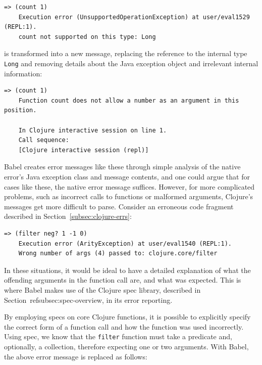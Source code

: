 \documentclass[12pt]{article}
\newcommand{\comment}[1]{{\bf \tt  {#1}}}
\newcommand{\emcomment}[1]{\textcolor{ForestGreen}{\comment{Elena: {#1}}}}
\begin{document}
\begin{lstlisting}[breaklines=true, basicstyle=\ttfamily]
    => (count 1)
    Execution error (UnsupportedOperationException) at user/eval1529 (REPL:1).
    count not supported on this type: Long
\end{lstlisting}
    
is transformed into a new message, replacing the reference to the internal type \verb|Long| and removing details about the Java exception object and irrelevant internal information:

\begin{lstlisting}[breaklines=true, basicstyle=\ttfamily]
    => (count 1)
    Function count does not allow a number as an argument in this position.

    In Clojure interactive session on line 1.
    Call sequence:
    [Clojure interactive session (repl)]
\end{lstlisting}

Babel creates error messages like these through simple analysis of the native error's Java exception class and message contents, and one could argue that for cases like these, the native error message suffices. However, for more complicated problems, such as incorrect calls to functions or malformed arguments, Clojure's messages get more difficult to parse. Consider an erroneous code fragment described in Section~\ref{subsec:clojure-errs}: %

\begin{lstlisting}[breaklines=true, basicstyle=\ttfamily]
    => (filter neg? 1 -1 0)
    Execution error (ArityException) at user/eval1540 (REPL:1).
    Wrong number of args (4) passed to: clojure.core/filter
\end{lstlisting}

In these situations, it would be ideal to have a detailed explanation of what the offending arguments in the function call are, and what was expected. This is where Babel makes use of the Clojure spec library, described in Section~ref{subsec:spec-overview}, in its error reporting.

By employing specs on core Clojure functions, it is possible to explicitly specify the correct form of a function call and how the function was used incorrectly. Using spec, we know that the \verb|filter| function must take a predicate and, optionally, a collection, therefore expecting one or two arguments. With Babel, the above error message is replaced as follows:
\end{document}
